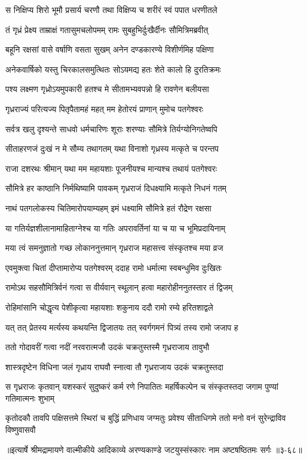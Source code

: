 \twolineshloka
{स निक्षिप्य शिरो भूमौ प्रसार्य चरणौ तथा}
{विक्षिप्य च शरीरं स्वं पपात धरणीतले} %

\twolineshloka
{तं गृध्रं प्रेक्ष्य ताम्राक्षं गतासुमचलोपमम्}
{रामः सुबहुभिर्दुःखैर्दीनः सौमित्रिमब्रवीत्} %

\twolineshloka
{बहूनि रक्षसां वासे वर्षाणि वसता सुखम्}
{अनेन दण्डकारण्ये विशीर्णमिह पक्षिणा} %

\twolineshloka
{अनेकवार्षिको यस्तु चिरकालसमुत्थितः}
{सोऽयमद्य हतः शेते कालो हि दुरतिक्रमः} %

\twolineshloka
{पश्य लक्ष्मण गृध्रोऽयमुपकारी हतश्च मे}
{सीतामभ्यवपन्नो हि रावणेन बलीयसा} %

\twolineshloka
{गृध्रराज्यं परित्यज्य पितृपैतामहं महत्}
{मम हेतोरयं प्राणान् मुमोच पतगेश्वरः} %

\twolineshloka
{सर्वत्र खलु दृश्यन्ते साधवो धर्मचारिणः}
{शूराः शरण्याः सौमित्रे तिर्यग्योनिगतेष्वपि} %

\twolineshloka
{सीताहरणजं दुःखं न मे सौम्य तथागतम्}
{यथा विनाशो गृध्रस्य मत्कृते च परन्तप} %

\twolineshloka
{राजा दशरथः श्रीमान् यथा मम महायशाः}
{पूजनीयश्च मान्यश्च तथायं पतगेश्वरः} %

\twolineshloka
{सौमित्रे हर काष्ठानि निर्मथिष्यामि पावकम्}
{गृध्रराजं दिधक्ष्यामि मत्कृते निधनं गतम्} %

\twolineshloka
{नाथं पतगलोकस्य चितिमारोपयाम्यहम्}
{इमं धक्ष्यामि सौमित्रे हतं रौद्रेण रक्षसा} %

\twolineshloka
{या गतिर्यज्ञशीलानामाहिताग्नेश्च या गतिः}
{अपरावर्तिनां या च या च भूमिप्रदायिनाम्} %

\twolineshloka
{मया त्वं समनुज्ञातो गच्छ लोकाननुत्तमान्}
{गृध्रराज महासत्त्व संस्कृतश्च मया व्रज} %

\twolineshloka
{एवमुक्त्वा चितां दीप्तामारोप्य पतगेश्वरम्}
{ददाह रामो धर्मात्मा स्वबन्धुमिव दुःखितः} %

\twolineshloka
{रामोऽथ सहसौमित्रिर्वनं गत्वा स वीर्यवान्}
{स्थूलान् हत्वा महारोहीननुतस्तार तं द्विजम्} %

\twolineshloka
{रोहिमांसानि चोद्धृत्य पेशीकृत्वा महायशाः}
{शकुनाय ददौ रामो रम्ये हरितशाद्वले} %

\twolineshloka
{यत् तत् प्रेतस्य मर्त्यस्य कथयन्ति द्विजातयः}
{तत् स्वर्गगमनं पित्र्यं तस्य रामो जजाप ह} %

\twolineshloka
{ततो गोदावरीं गत्वा नदीं नरवरात्मजौ}
{उदकं चक्रतुस्तस्मै गृध्रराजाय तावुभौ} %

\twolineshloka
{शास्त्रदृष्टेन विधिना जलं गृध्राय राघवौ}
{स्नात्वा तौ गृध्रराजाय उदकं चक्रतुस्तदा} %

\twolineshloka
{स गृध्रराजः कृतवान् यशस्करं सुदुष्करं कर्म रणे निपातितः}
{महर्षिकल्पेन च संस्कृतस्तदा जगाम पुण्यां गतिमात्मनः शुभाम्} %

\twolineshloka
{कृतोदकौ तावपि पक्षिसत्तमे स्थिरां च बुद्धिं प्रणिधाय जग्मतुः}
{प्रवेश्य सीताधिगमे ततो मनो वनं सुरेन्द्राविव विष्णुवासवौ} %


॥इत्यार्षे श्रीमद्रामायणे वाल्मीकीये आदिकाव्ये अरण्यकाण्डे जटयुस्संस्कारः नाम अष्टषष्ठितमः सर्गः ॥३-६८॥
